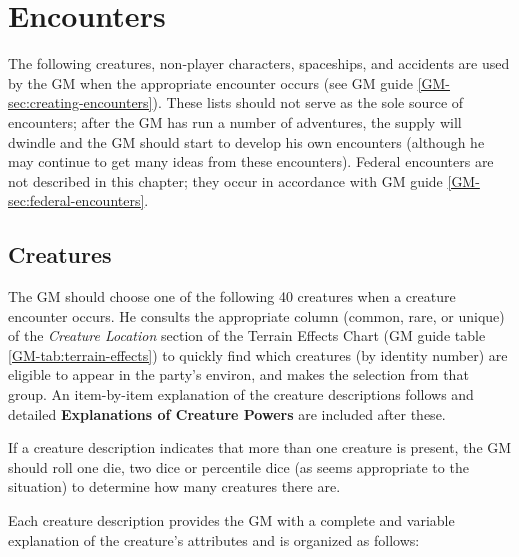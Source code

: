 

\chapter{Encounters}
\label{cha:encounters}

The following creatures, non-player characters, spaceships, and
accidents are used by the GM when the appropriate encounter occurs
(see GM guide \ref{GM-sec:creating-encounters}). These lists should
not serve as the sole source of encounters; after the GM has run a
number of adventures, the supply will dwindle and the GM should start
to develop his own encounters (although he may continue to get many
ideas from these encounters).  Federal encounters are not described in
this chapter; they occur in accordance with GM guide
\ref{GM-sec:federal-encounters}.

\section{Creatures}
\label{sec:creatures}

The GM should choose one of the following 40 creatures when a creature
encounter occurs. He consults the appropriate column (common, rare, or
unique) of the \emph{Creature Location} section of the Terrain Effects
Chart (GM guide table \ref{GM-tab:terrain-effects}) to quickly find
which creatures (by identity number) are eligible to appear in the
party's environ, and makes the selection from that group. An
item-by-item explanation of the creature descriptions follows and
detailed \textbf{Explanations of Creature Powers} are included after
these.

If a creature description indicates that more than one creature is
present, the GM should roll one die, two dice or percentile dice (as
seems appropriate to the situation) to determine how many creatures
there are.

Each creature description provides the GM with a complete and variable
explanation of the creature's attributes and is organized as follows:

